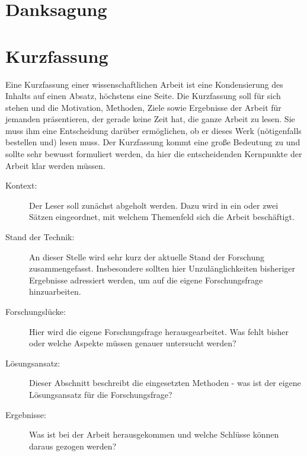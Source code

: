 \documentclass[12pt,a4paper,twoside]{book}
\begin{document}
	\clearemptydoublepage
	\section*{Danksagung}


	\par


	\clearemptydoublepage
	\section*{Kurzfassung}
	Eine Kurzfassung einer wissenschaftlichen Arbeit ist eine Kondensierung des Inhalts auf einen Absatz, höchstens eine Seite.
	Die Kurzfassung soll für sich stehen und die Motivation, Methoden, Ziele sowie Ergebnisse der Arbeit für jemanden präsentieren, der gerade keine Zeit hat, die ganze Arbeit zu lesen.
	Sie muss ihm eine Entscheidung darüber ermöglichen, ob er dieses Werk (nötigenfalls bestellen und) lesen muss. Der Kurzfassung kommt eine große Bedeutung zu und sollte sehr bewusst formuliert werden, da hier die entscheidenden Kernpunkte der Arbeit klar werden müssen.
	\begin{description}
		\item[Kontext:]{Der Leser soll zunächst abgeholt werden. Dazu wird in ein oder zwei Sätzen eingeordnet, mit welchem Themenfeld sich die Arbeit beschäftigt.}
		\item[Stand der Technik:]{An dieser Stelle wird sehr kurz der aktuelle Stand der Forschung zusammengefasst. Insbesondere sollten hier Unzulänglichkeiten bisheriger Ergebnisse adressiert werden, um auf die eigene Forschungsfrage hinzuarbeiten. }
		\item[Forschungslücke:]{Hier wird die eigene Forschungsfrage herausgearbeitet. Was fehlt bisher oder welche Aspekte müssen genauer untersucht werden?}
		\item[Lösungsansatz:]{Dieser Abschnitt beschreibt die eingesetzten Methoden - was ist der eigene Lösungsansatz für die Forschungsfrage?}
		\item[Ergebnisse:]{Was ist bei der Arbeit herausgekommen und welche Schlüsse können daraus gezogen werden?}
	\end{description}
	
\end{document}
